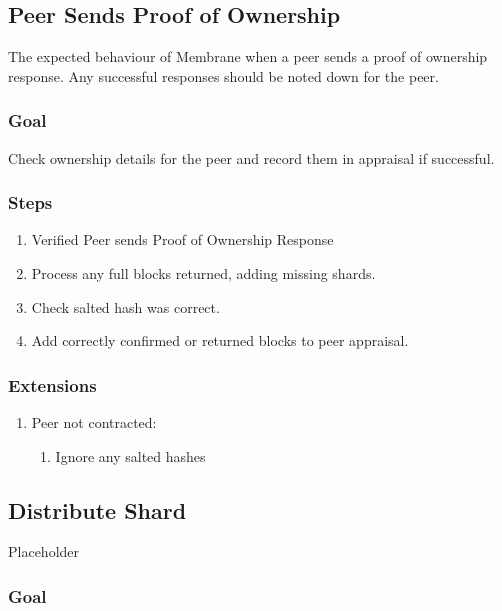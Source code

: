\documentclass[a4paper, 11pt, twocolumn, twoside]{report}
\begin{document}
\subsection{Peer Sends Proof of Ownership}

The expected behaviour of Membrane when a peer sends a proof of ownership response. Any successful responses should be noted down for the peer.

\subsubsection{Goal}

Check ownership details for the peer and record them in appraisal if successful.

\subsubsection{Steps}

\begin{enumerate}
 \item Verified Peer sends Proof of Ownership Response
 \item Process any full blocks returned, adding missing shards.
 \item Check salted hash was correct.
 \item Add correctly confirmed or returned blocks to peer appraisal.
\end{enumerate}

\subsubsection{Extensions}
\begin{enumerate}
  \item Peer not contracted:
	\begin{enumerate}
	  \item Ignore any salted hashes
	\end{enumerate}
\end{enumerate}

\subsection{Distribute Shard}

Placeholder

\subsubsection{Goal}
\end{document}
